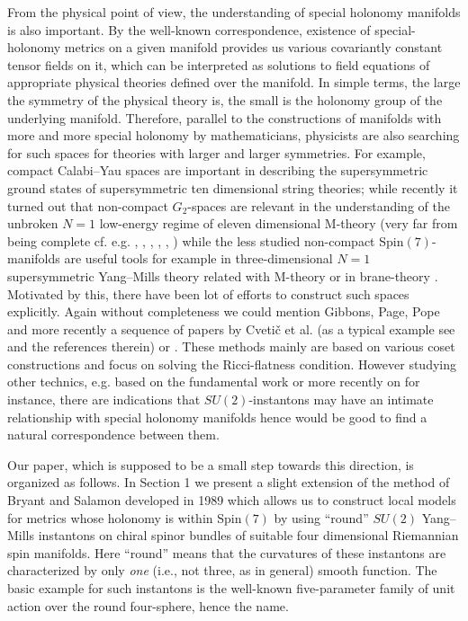 \documentclass[a4paper,12pt,draft]{article}
\begin{document}
From the physical point of view, the understanding of special holonomy
manifolds is also important. By the well-known correspondence, existence
of special-holonomy metrics on a given manifold provides us various
covariantly constant tensor fields on it, which can be interpreted as
solutions to field equations of appropriate physical theories defined over
the manifold. In simple terms, the large the symmetry of the physical
theory is, the small is the holonomy group of the underlying
manifold. Therefore, parallel to the constructions of manifolds with
more and more special holonomy by mathematicians, physicists are also
searching for such spaces for theories
with larger and larger symmetries. For example, compact Calabi--Yau spaces
are important in describing  the supersymmetric ground states of
supersymmetric ten dimensional string theories; while recently it turned
out that non-compact $G_2$-spaces are relevant in the understanding of the
unbroken $N=1$ low-energy regime of eleven dimensional M-theory
(very far from being complete cf. e.g. \cite{ach1},
\cite{ach2}, \cite{ach-wit}, \cite{ati-mal-vaf},
\cite{ati-wit}, \cite{wit}) while the less studied non-compact
Spin$(7)$-manifolds are useful tools for example in three-dimensional
$N=1$ supersymmetric Yang--Mills theory related with M-theory
\cite{guk-spa} or in brane-theory \cite{cve-gib-lu-pop}. Motivated by
this, there have been lot of efforts to construct such spaces explicitly.
Again without completeness we could mention Gibbons, Page,
Pope \cite{gib-pag-pop} and more recently a sequence of papers by Cveti\v
c et al. (as a typical example see \cite{cve-gib-lu-pop} and the
references therein) or \cite{guk-spa}. These
methods mainly are based on various coset constructions
and focus on solving the Ricci-flatness condition. However studying
other technics, e.g. based on the fundamental work \cite{bry-sal} or
more recently on \cite{bak-flo-keh} for instance, there
are indications that $SU(2)$-instantons may have an intimate relationship
with special holonomy manifolds hence would be good to find a natural
correspondence between them.  

Our paper, which is supposed to be a small step towards this direction, is
organized as follows. In Section 1 we present a slight
extension of the method of Bryant and Salamon developed in
1989 \cite{bry-sal} which allows us to construct local models for metrics
whose holonomy is within Spin$(7)$ by using ``round'' $SU(2)$ Yang--Mills
instantons on chiral spinor bundles of suitable four dimensional
Riemannian spin manifolds. Here ``round'' means that the curvatures of
these instantons are characterized by only {\it one} (i.e., not three, as
in general) smooth function. The basic example for such instantons is the
well-known five-parameter family of unit action over the round
four-sphere, hence the name. 
\end{document}

